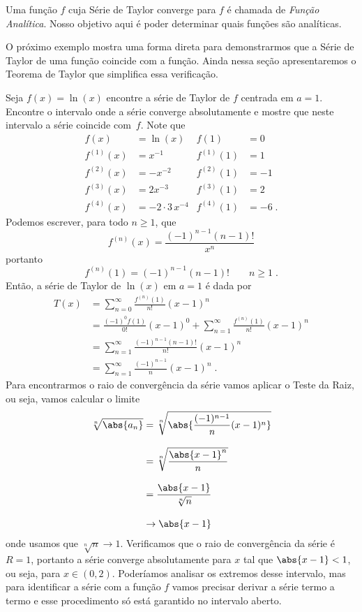 Uma função $f$ cuja Série de Taylor converge para $f$
é chamada de \emph{Função Analítica}. Nosso objetivo aqui
é poder determinar quais funções são analíticas.

O próximo exemplo mostra uma forma direta para demonstrarmos que a Série de Taylor
de uma função coincide com a função. Ainda nessa seção apresentaremos o Teorema de Taylor
que simplifica essa verificação.

\begin{example}
  Seja $f(x)=\ln(x)$ encontre a série de Taylor de $f$ centrada em $a=1$.
  Encontre o intervalo onde a série converge absolutamente e mostre
  que neste intervalo a série coincide com~$f$.
  \solution
  Note que
  \begin{align*}
    f(x)       & = \ln(x)            & f(1)       & =  0      \\[3mm]
    f^{(1)}(x) & = x^{-1}            & f^{(1)}(1) & =  1      \\[3mm]
    f^{(2)}(x) & = -x^{-2}           & f^{(2)}(1) & = -1      \\[3mm]
    f^{(3)}(x) & = 2x^{-3}           & f^{(3)}(1) & =  2      \\[3mm]
    f^{(4)}(x) & = -2\cdot 3\,x^{-4} & f^{(4)}(1) & = -6  \;.
  \end{align*}
  Podemos escrever, para todo $n\geq 1$, que
  \[
    f^{(n)}(x) = \frac{(-1)^{n-1}(n-1)!}{x^n}
  \]
  portanto
  \[
    f^{(n)}(1) = (-1)^{n-1}(n-1)! \qquad n\geq 1 \;.
  \]
  Então, a série de Taylor de $\ln(x)$ em $a=1$ é dada por
  \begin{align*}
    T(x)
    & = \sum_{n=0}^\infty \frac{f^{(n)}(1)}{n!}(x-1)^n \\[3mm]
    & = \frac{(-1)^0 f(1)}{0!}(x-1)^0 + \sum_{n=1}^\infty \frac{f^{(n)}(1)}{n!}(x-1)^n \\[3mm]
    & = \sum_{n=1}^\infty \frac{(-1)^{n-1}(n-1)!}{n!} (x-1)^n \\[3mm]
    & = \sum_{n=1}^\infty \frac{(-1)^{n-1}}{n} (x-1)^n  \;.
  \end{align*}
  Para encontrarmos o raio de convergência da série
  vamos aplicar o Teste da Raiz, ou seja, vamos calcular o limite
  \begin{align*}
    \sqrt[n]{\abs{a_n}}
    & = \sqrt[n]{\abs{\frac{(-1)^{n-1}}{n}(x-1)^n}} \\[3mm]
    & = \sqrt[n]{\frac{\abs{x-1}^n}{n}} \\[3mm]
    & = \frac{\abs{x-1}}{\sqrt[n]{n}} \\[3mm]
    & \rightarrow \abs{x-1}
  \end{align*}
  onde usamos que \(\sqrt[n]{n}\rightarrow 1\).
  Verificamos que o raio de convergência da série é $R=1$,
  portanto a série converge absolutamente para $x$ tal que $\abs{x-1}<1$,
  ou seja, para $x\in (0, 2)$.
  Poderíamos analisar os extremos desse intervalo,
  mas para identificar a série com a função $f$
  vamos precisar derivar a série termo a termo
  e esse procedimento só está garantido no intervalo aberto.


\end{example}
